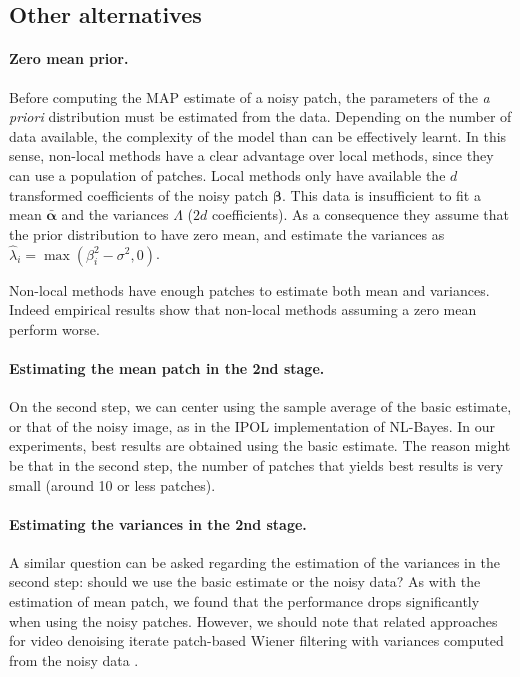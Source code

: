 \documentclass{ipol}
\newcommand{\ma}[1]{\boldsymbol{#1}}
\begin{document}
\subsection{Other alternatives}

\paragraph{Zero mean prior.}
Before computing the MAP estimate of a noisy patch, the parameters of the \emph{a
priori} distribution must be estimated from the data. Depending on the number of 
data available, the complexity of the model than can be effectively learnt. In this
sense, non-local methods have a clear advantage over local methods, since they 
can use a population of patches. Local methods only have available the $d$ transformed 
coefficients of the noisy patch $\ma \beta$. This data is insufficient to fit 
a mean $\bar {\ma \alpha}$ and the variances $\Lambda$ ($2d$ coefficients).
As a consequence they assume that the prior distribution to have zero mean, and 
estimate the variances as $\hat \lambda_i = \max(\beta_i^2 - \sigma^2,0)$.

Non-local methods have enough patches to estimate both mean and variances. Indeed
empirical results show that non-local methods assuming a zero mean perform worse. 

\paragraph{Estimating the mean patch in the 2nd stage.}
On the second step, we can center using the sample average of the basic estimate,
or that of the noisy image, as in the IPOL implementation of NL-Bayes. In our
experiments, best results are obtained using the basic estimate. The reason might be that
in the second step, the number of patches that yields best results is very
small (around 10 or less patches).

\paragraph{Estimating the variances in the 2nd stage.} A similar question can be 
asked regarding the estimation of the variances in the second step: should we use
the basic estimate or the noisy data? As with the
estimation of mean patch, we found that the performance drops significantly when 
using the noisy patches. However, we should note that related approaches for 
video denoising iterate patch-based Wiener filtering with variances computed 
from the noisy data \cite{LiZhangDai2011}.
\end{document}
